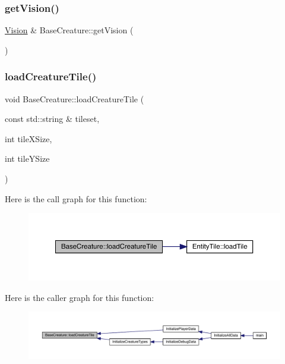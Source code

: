 \subsubsection{\texorpdfstring{get\+Vision()}{getVision()}}
{\footnotesize\ttfamily \mbox{\hyperlink{class_vision}{Vision}} \& Base\+Creature\+::get\+Vision (\begin{DoxyParamCaption}{ }\end{DoxyParamCaption})}

\mbox{\label{class_base_creature_af2066b8eb62bf595d30feae6671e4495}} 
\subsubsection{\texorpdfstring{load\+Creature\+Tile()}{loadCreatureTile()}}
{\footnotesize\ttfamily void Base\+Creature\+::load\+Creature\+Tile (\begin{DoxyParamCaption}\item[{const std\+::string \&}]{tileset,  }\item[{int}]{tile\+X\+Size,  }\item[{int}]{tile\+Y\+Size }\end{DoxyParamCaption})}

Here is the call graph for this function\+:
\nopagebreak
\begin{figure}[H]
\begin{center}
\leavevmode
\includegraphics[width=350pt]{d2/d3b/class_base_creature_af2066b8eb62bf595d30feae6671e4495_cgraph}
\end{center}
\end{figure}
Here is the caller graph for this function\+:
\nopagebreak
\begin{figure}[H]
\begin{center}
\leavevmode
\includegraphics[width=350pt]{d2/d3b/class_base_creature_af2066b8eb62bf595d30feae6671e4495_icgraph}
\end{center}
\end{figure}
\mbox{\label{class_base_creature_a77f0a7d7c441406c252c3278817454d8}} 
